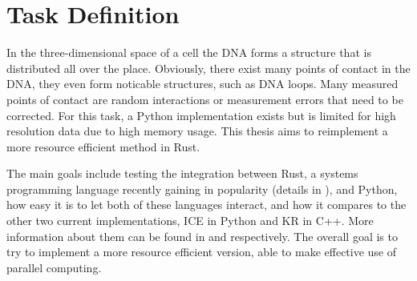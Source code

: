 %
%
%
%
%
%



\section{Task Definition}\label{sec:task}

In the three-dimensional space of a cell the DNA forms a structure that is
distributed all over the place. Obviously, there exist many points of contact
in the DNA, they even form noticable structures, such as DNA loops. Many
measured points of contact are random interactions or measurement errors that
need to be corrected. For this task, a Python implementation exists but is
limited for high resolution data due to high memory usage. This thesis aims to
reimplement a more resource efficient method in Rust.

The main goals include testing the integration between Rust, a systems
programming language recently gaining in popularity (details in
), and Python, how easy it is to let both of these languages
interact, and how it compares to the other two current implementations, ICE in
Python and KR in C++. More information about them can be found in
 and  respectively. The overall goal is to
try to implement a more resource efficient version, able to make effective use
of parallel computing.


